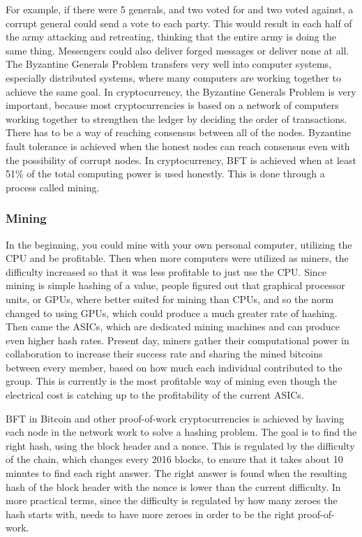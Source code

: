 \documentclass[11pt]{article}
\begin{document}
For example, if there were 5 generals, and two voted for and two voted against, a corrupt general could send a vote to each party. This would result in each half of the army attacking and retreating, thinking that the entire army is doing the same thing.  Messengers could also deliver forged messages or deliver none at all. The Byzantine Generals Problem transfers very well into computer systems, especially distributed systems, where many computers are working together to achieve the same goal. In cryptocurrency, the Byzantine Generals Problem is very important, because most cryptocurrencies is based on a network of computers working together to strengthen the ledger by deciding the order of transactions. There has to be a way of reaching consensus between all of the nodes. Byzantine fault tolerance is achieved when the honest nodes can reach consensus even with the possibility of corrupt nodes. In cryptocurrency, BFT is achieved when at least 51\% of the total computing power is used honestly. This is done through a process called mining.
 
\subsubsection{Mining}

In the beginning, you could mine with your own personal computer, utilizing the CPU and be profitable. Then when more computers were utilized as miners, the difficulty increased so that it was less profitable to just use the CPU. Since mining is  simple hashing of a value, people figured out that graphical processor units, or GPUs, where better suited for mining than CPUs, and so the norm changed to using GPUs, which could produce a much greater rate of hashing. Then came the ASICs, which are dedicated mining machines and can produce even higher hash rates. Present day, miners gather their computational power in collaboration to increase their success rate and sharing the mined bitcoins between every member, based on how much each individual contributed to the group. This is currently is the most profitable way of mining even though the electrical cost is catching up to the profitability of the current ASICs.

BFT in Bitcoin and other proof-of-work cryptocurrencies is achieved by having each node in the network work to solve a hashing problem. The goal is to find the right hash, using the block header and a nonce. This is regulated by the difficulty of the chain, which changes every 2016 blocks, to ensure that it takes about 10 minutes to find each right answer. The right answer is found when the resulting hash of the block header with the nonce is lower than the current difficulty. In more practical terms, since the difficulty is regulated by how many zeroes the hash starts with, needs to have more zeroes in order to be the right proof-of-work.
\end{document}
